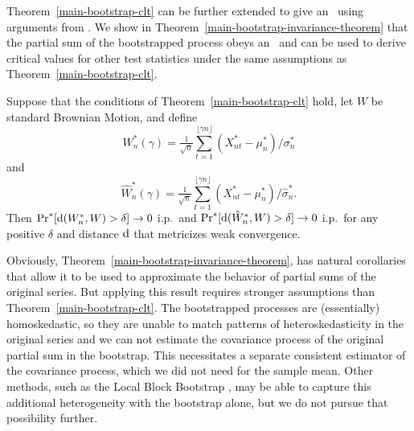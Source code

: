 \documentclass[11pt]{article}
\begin{document}
Theorem~\ref{main-bootstrap-clt} can be further extended to give an
\fclt\ using arguments from \citet{JoD:00b}. We show in
Theorem~\ref{main-bootstrap-invariance-theorem} that the partial sum
of the bootstrapped process obeys an \fclt\ and can be used to derive
critical values for other test statistics under the same assumptions
as Theorem~\ref{main-bootstrap-clt}.

\begin{thm}\label{main-bootstrap-invariance-theorem}
  Suppose that the conditions of Theorem~\ref{main-bootstrap-clt}
  hold, let $W$ be standard Brownian Motion, and define
  \begin{equation}
    \label{eq:6}
    W_n^{*}(\gamma) = \tfrac{1}{\sqrt{n}}
    \sum_{t=1}^{\lfloor \gamma n \rfloor} (X^*_{nt} - \mu_n^{*}) / \sigma_{n}^{*}
  \end{equation}
  and
  \begin{equation}
    \label{eq:7}
    \hat{W}_n^{*}(\gamma) = \tfrac{1}{\sqrt{n}}
    \sum_{t=1}^{\lfloor \gamma n \rfloor} (X^*_{nt} - \mu_n^{*}) / \hat\sigma_n^{*}.
  \end{equation}
  Then $\operatorname{Pr}^{*}[\operatorname{d}(W_n^{*}, W) > \delta] \to 0$ i.p.\ and
  $\operatorname{Pr}^{*}[\operatorname{d}(\hat{W}_n^{*}, W) > \delta] \to 0$ i.p.\ for any
  positive $\delta$ and distance $\operatorname{d}$ that metricizes weak
  convergence.
\end{thm}

Obviously, Theorem~\ref{main-bootstrap-invariance-theorem}, has
natural corollaries that allow it to be used to approximate the
behavior of partial sums of the original series.  But applying this
result requires stronger assumptions than
Theorem~\ref{main-bootstrap-clt}. The bootstrapped processes are
(essentially) homoskedastic, so they are unable to match patterns of
heteroskedasticity in the original series and we can not estimate the
covariance process of the original partial sum in the bootstrap. This
necessitates a separate consistent estimator of the covariance process, which
we did not need for the sample mean.  Other methods, such as the Local
Block Bootstrap \citep{PaP:02,DPP:03}, may be able to capture this
additional heterogeneity with the bootstrap alone, but we do not
pursue that possibility further.
\end{document}
